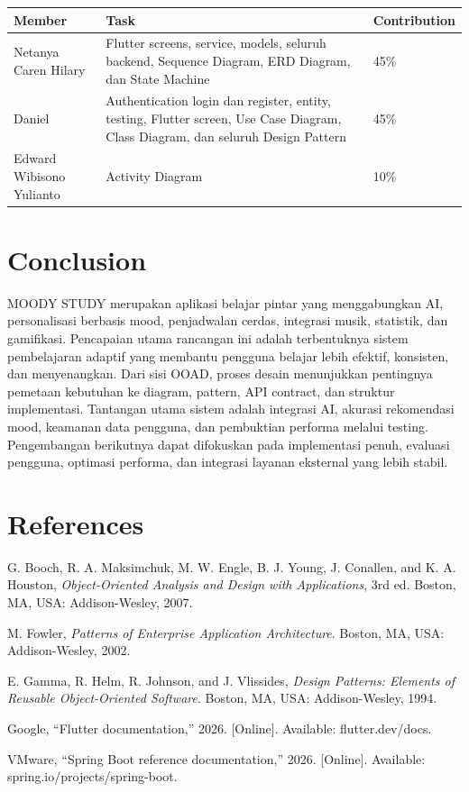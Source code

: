 \documentclass[11pt]{article}
\begin{document}
\begin{center}
\renewcommand{\arraystretch}{1.3}
\begin{tabular}{|p{}|p{}|p{}|}
\hline
\textbf{Member} & \textbf{Task} & \textbf{Contribution} \\
\hline
Netanya Caren Hilary & Flutter screens, service, models, seluruh backend, Sequence Diagram, ERD Diagram, dan State Machine & 45\% \\
\hline
Daniel & Authentication login dan register, entity, testing, Flutter screen, Use Case Diagram, Class Diagram, dan seluruh Design Pattern & 45\% \\
\hline
Edward Wibisono Yulianto & Activity Diagram & 10\% \\
\hline
\end{tabular}
\end{center}

\section{Conclusion}

MOODY STUDY merupakan aplikasi belajar pintar yang menggabungkan AI, personalisasi berbasis mood, penjadwalan cerdas, integrasi musik, statistik, dan gamifikasi. Pencapaian utama rancangan ini adalah terbentuknya sistem pembelajaran adaptif yang membantu pengguna belajar lebih efektif, konsisten, dan menyenangkan. Dari sisi OOAD, proses desain menunjukkan pentingnya pemetaan kebutuhan ke diagram, pattern, API contract, dan struktur implementasi. Tantangan utama sistem adalah integrasi AI, akurasi rekomendasi mood, keamanan data pengguna, dan pembuktian performa melalui testing. Pengembangan berikutnya dapat difokuskan pada implementasi penuh, evaluasi pengguna, optimasi performa, dan integrasi layanan eksternal yang lebih stabil.


\section{References}

\begin{enumerate}[label={[\arabic*]}]
    \item G. Booch, R. A. Maksimchuk, M. W. Engle, B. J. Young, J. Conallen, and K. A. Houston, \textit{Object-Oriented Analysis and Design with Applications}, 3rd ed. Boston, MA, USA: Addison-Wesley, 2007.
    \item M. Fowler, \textit{Patterns of Enterprise Application Architecture}. Boston, MA, USA: Addison-Wesley, 2002.
    \item E. Gamma, R. Helm, R. Johnson, and J. Vlissides, \textit{Design Patterns: Elements of Reusable Object-Oriented Software}. Boston, MA, USA: Addison-Wesley, 1994.
    \item Google, ``Flutter documentation,'' 2026. [Online]. Available: flutter.dev/docs.
    \item VMware, ``Spring Boot reference documentation,'' 2026. [Online]. Available: spring.io/projects/spring-boot.
\end{enumerate}
\end{document}
